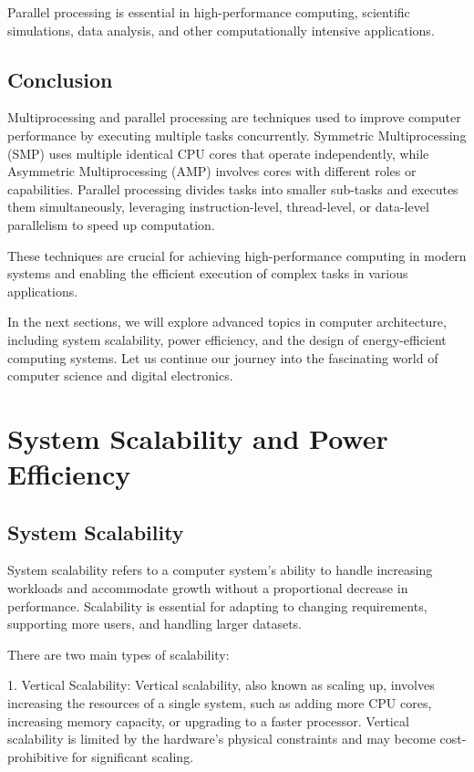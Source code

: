 \documentclass{article}
\begin{document}
Parallel processing is essential in high-performance computing, scientific simulations, data analysis, and other computationally intensive applications.

\subsection{Conclusion}

Multiprocessing and parallel processing are techniques used to improve computer performance by executing multiple tasks concurrently. Symmetric Multiprocessing (SMP) uses multiple identical CPU cores that operate independently, while Asymmetric Multiprocessing (AMP) involves cores with different roles or capabilities. Parallel processing divides tasks into smaller sub-tasks and executes them simultaneously, leveraging instruction-level, thread-level, or data-level parallelism to speed up computation.

These techniques are crucial for achieving high-performance computing in modern systems and enabling the efficient execution of complex tasks in various applications.

In the next sections, we will explore advanced topics in computer architecture, including system scalability, power efficiency, and the design of energy-efficient computing systems. Let us continue our journey into the fascinating world of computer science and digital electronics.

\newpage

\section{System Scalability and Power Efficiency}

\subsection{System Scalability}

System scalability refers to a computer system's ability to handle increasing workloads and accommodate growth without a proportional decrease in performance. Scalability is essential for adapting to changing requirements, supporting more users, and handling larger datasets.

There are two main types of scalability:

1. Vertical Scalability: Vertical scalability, also known as scaling up, involves increasing the resources of a single system, such as adding more CPU cores, increasing memory capacity, or upgrading to a faster processor. Vertical scalability is limited by the hardware's physical constraints and may become cost-prohibitive for significant scaling.
\end{document}
